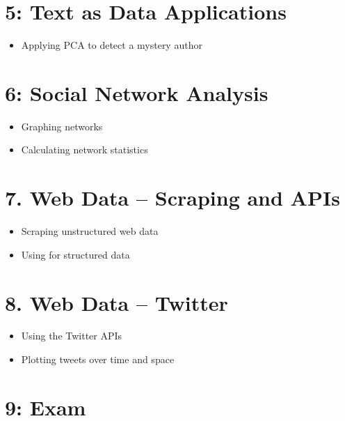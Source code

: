 \documentclass[]{article}
\begin{document}
 	\section*{\textnormal{5: Text as Data Applications}}
	
			\begin{itemize}
				\item Applying PCA to detect a mystery author

			\end{itemize}
	\section*{\textnormal{6: Social Network Analysis}}
	
			\begin{itemize}
				\item Graphing networks
				\item Calculating network statistics
			\end{itemize}
	
	\section*{\textnormal{7. Web Data -- Scraping and APIs}}

			\begin{itemize}
				\item Scraping unstructured web data
				\item Using for structured data
			\end{itemize}

	\section*{\textnormal{8. Web Data -- Twitter}}
	
				\begin{itemize}
					\item Using the Twitter APIs
					\item Plotting tweets over time and space
				\end{itemize}

	\section*{\textnormal{9: Exam}}

	
	




				{}
				
	
	
	
	
	
\end{document}
